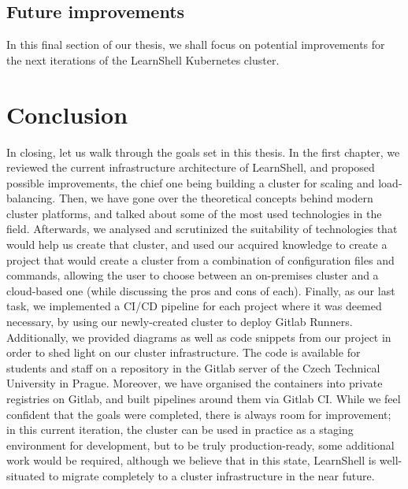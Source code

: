 \documentclass[thesis=B,english]{FITthesis}[2019/12/23]
\begin{document}
\section{Future improvements}

In this final section of our thesis, we shall focus on potential improvements for the next iterations of the LearnShell Kubernetes cluster.





\chapter{Conclusion}

In closing, let us walk through the goals set in this thesis. 
\newline
In the first chapter, we reviewed the current infrastructure architecture of LearnShell, and proposed possible improvements, the chief one being building a cluster for scaling and load-balancing. Then, we have gone over the theoretical concepts behind modern cluster platforms, and talked about some of the most used technologies in the field. Afterwards, we analysed and scrutinized the suitability of technologies that would help us create that cluster, and used our acquired knowledge to create a project that would create a cluster from a combination of configuration files and commands, allowing the user to choose between an on-premises cluster and a cloud-based one (while discussing the pros and cons of each). Finally, as our last task, we implemented a CI/CD pipeline for each project where it was deemed necessary, by using our newly-created cluster to deploy Gitlab Runners. Additionally, we provided diagrams as well as code snippets from our project in order to shed light on our cluster infrastructure. 
\newline
The code is available for students and staff on a repository in the Gitlab server of the Czech Technical University in Prague. Moreover, we have organised the containers into private registries on Gitlab, and built pipelines around them via Gitlab CI.
\newline
While we feel confident that the goals were completed, there is always room for improvement; in this current iteration, the cluster can be used in practice as a staging environment for development, but to be truly production-ready, some additional work would be required, although we believe that in this state, LearnShell is well-situated to migrate completely to a cluster infrastructure in the near future.
\end{document}
